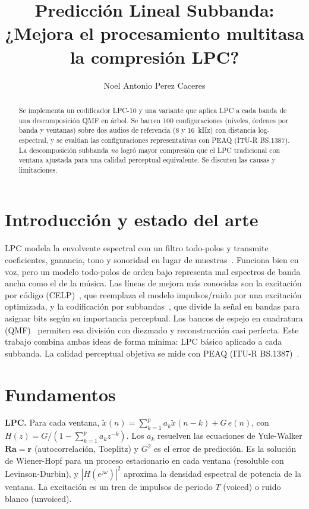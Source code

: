 \documentclass[10pt,twocolumn]{article}
\title{\vspace{-1.2cm}Predicci\'on Lineal Subbanda: \\ ¿Mejora el procesamiento multitasa la compresi\'on LPC?}
\author{Noel Antonio Perez Caceres}
\date{}
\begin{document}
\maketitle
\begin{abstract}
Se implementa un codificador LPC-10 y una variante que aplica LPC a cada banda de una descomposici\'on QMF en \'arbol. Se barren 100 configuraciones (niveles, \'ordenes por banda y ventanas) sobre dos audios de referencia (8 y 16~kHz) con distancia log-espectral, y se eval\'uan las configuraciones representativas con PEAQ (ITU-R BS.1387). La descomposici\'on subbanda \emph{no} logr\'o mayor compresi\'on que el LPC tradicional con ventana ajustada para una calidad perceptual equivalente. Se discuten las causas y limitaciones.
\end{abstract}

\section{Introducci\'on y estado del arte}
LPC modela la envolvente espectral con un filtro todo-polos y transmite coeficientes, ganancia, tono y sonoridad en lugar de muestras~\cite{atal71,tremain82}. Funciona bien en voz, pero un modelo todo-polos de orden bajo representa mal espectros de banda ancha como el de la m\'usica. Las l\'ineas de mejora m\'as conocidas son la excitaci\'on por c\'odigo (CELP)~\cite{schroeder85}, que reemplaza el modelo impulsos/ruido por una excitaci\'on optimizada, y la codificaci\'on por subbandas~\cite{crochiere76}, que divide la se\~nal en bandas para asignar bits seg\'un su importancia perceptual. Los bancos de espejo en cuadratura (QMF)~\cite{esteban77,johnston80,vaid93} permiten esa divisi\'on con diezmado y reconstrucci\'on casi perfecta. Este trabajo combina ambas ideas de forma m\'inima: LPC b\'asico aplicado a cada subbanda. La calidad perceptual objetiva se mide con PEAQ (ITU-R BS.1387)~\cite{bs1387}.

\section{Fundamentos}
\textbf{LPC.} Para cada ventana, $\tilde x(n)=\sum_{k=1}^{p}a_k\tilde x(n-k)+G\,e(n)$, con $H(z)=G/(1-\sum_{k=1}^{p}a_kz^{-k})$. Los $a_k$ resuelven las ecuaciones de Yule-Walker $\mathbf R\mathbf a=\mathbf r$ (autocorrelaci\'on, Toeplitz) y $G^2$ es el error de predicci\'on. Es la soluci\'on de Wiener-Hopf para un proceso estacionario en cada ventana (resoluble con Levinson-Durbin), y $|H(e^{j\omega})|^2$ aproxima la densidad espectral de potencia de la ventana. La excitaci\'on es un tren de impulsos de periodo $T$ (voiced) o ruido blanco (unvoiced).
\end{document}
